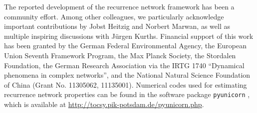 \documentclass[graybox]{svmult}
\begin{document}
\begin{acknowledgement}
The reported development of the recurrence network framework has been a community effort. Among other colleagues, we particularly acknowledge important contributions by Jobst Heitzig and Norbert Marwan, as well as multiple inspiring discussions with J\"urgen Kurths. Financial support of this work has been granted by the German Federal Environmental Agency, the European Union Seventh Framework Program, the Max Planck Society, the Stordalen Foundation, the German Research Association via the IRTG 1740 ``Dynamical phenomena in complex networks'', and the National Natural Science Foundation of China (Grant No. 11305062, 11135001). Numerical codes used for estimating recurrence network properties can be found in the software package \texttt{pyunicorn} \cite{donges2013advanced}, which is available at \url{http://tocsy.pik-potsdam.de/pyunicorn.php}.
\end{acknowledgement}
%
%

%


\end{document}
